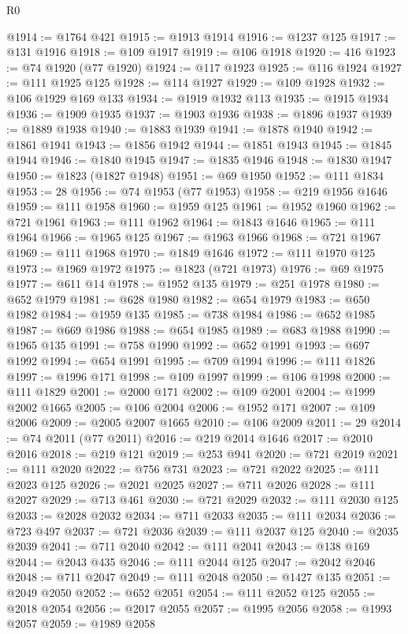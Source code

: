 \begin{lexlean}{R0}
\begin{coremodule}
@1914 := @1764 @421
@1915 := @1913 @1914
@1916 := @1237 @125
@1917 := @131 @1916
@1918 := @109 @1917
@1919 := @106 @1918
@1920 := 416
@1923 := @74 @1920 (@77 @1920)
@1924 := @117 @1923
@1925 := @116 @1924
@1927 := @111 @1925 @125
@1928 := @114 @1927
@1929 := @109 @1928
@1932 := @106 @1929 @169 @133
@1934 := @1919 @1932 @113
@1935 := @1915 @1934
@1936 := @1909 @1935
@1937 := @1903 @1936
@1938 := @1896 @1937
@1939 := @1889 @1938
@1940 := @1883 @1939
@1941 := @1878 @1940
@1942 := @1861 @1941
@1943 := @1856 @1942
@1944 := @1851 @1943
@1945 := @1845 @1944
@1946 := @1840 @1945
@1947 := @1835 @1946
@1948 := @1830 @1947
@1950 := @1823 (@1827 @1948)
@1951 := @69 @1950
@1952 := @111 @1834
@1953 := 28
@1956 := @74 @1953 (@77 @1953)
@1958 := @219 @1956 @1646
@1959 := @111 @1958
@1960 := @1959 @125
@1961 := @1952 @1960
@1962 := @721 @1961
@1963 := @111 @1962
@1964 := @1843 @1646
@1965 := @111 @1964
@1966 := @1965 @125
@1967 := @1963 @1966
@1968 := @721 @1967
@1969 := @111 @1968
@1970 := @1849 @1646
@1972 := @111 @1970 @125
@1973 := @1969 @1972
@1975 := @1823 (@721 @1973)
@1976 := @69 @1975
@1977 := @611 @14
@1978 := @1952 @135
@1979 := @251 @1978
@1980 := @652 @1979
@1981 := @628 @1980
@1982 := @654 @1979
@1983 := @650 @1982
@1984 := @1959 @135
@1985 := @738 @1984
@1986 := @652 @1985
@1987 := @669 @1986
@1988 := @654 @1985
@1989 := @683 @1988
@1990 := @1965 @135
@1991 := @758 @1990
@1992 := @652 @1991
@1993 := @697 @1992
@1994 := @654 @1991
@1995 := @709 @1994
@1996 := @111 @1826
@1997 := @1996 @171
@1998 := @109 @1997
@1999 := @106 @1998
@2000 := @111 @1829
@2001 := @2000 @171
@2002 := @109 @2001
@2004 := @1999 @2002 @1665
@2005 := @106 @2004
@2006 := @1952 @171
@2007 := @109 @2006
@2009 := @2005 @2007 @1665
@2010 := @106 @2009
@2011 := 29
@2014 := @74 @2011 (@77 @2011)
@2016 := @219 @2014 @1646
@2017 := @2010 @2016
@2018 := @219 @121
@2019 := @253 @941
@2020 := @721 @2019
@2021 := @111 @2020
@2022 := @756 @731
@2023 := @721 @2022
@2025 := @111 @2023 @125
@2026 := @2021 @2025
@2027 := @711 @2026
@2028 := @111 @2027
@2029 := @713 @461
@2030 := @721 @2029
@2032 := @111 @2030 @125
@2033 := @2028 @2032
@2034 := @711 @2033
@2035 := @111 @2034
@2036 := @723 @497
@2037 := @721 @2036
@2039 := @111 @2037 @125
@2040 := @2035 @2039
@2041 := @711 @2040
@2042 := @111 @2041
@2043 := @138 @169
@2044 := @2043 @435
@2046 := @111 @2044 @125
@2047 := @2042 @2046
@2048 := @711 @2047
@2049 := @111 @2048
@2050 := @1427 @135
@2051 := @2049 @2050
@2052 := @652 @2051
@2054 := @111 @2052 @125
@2055 := @2018 @2054
@2056 := @2017 @2055
@2057 := @1995 @2056
@2058 := @1993 @2057
@2059 := @1989 @2058

\end{coremodule}
\end{lexlean}
